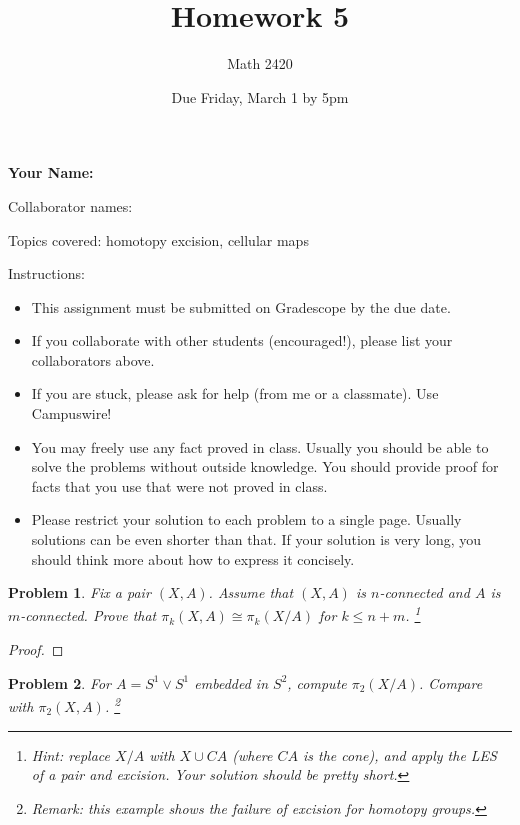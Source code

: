 \documentclass[11pt]{article}
\author{Math 2420}
\date{Due Friday, March 1 by 5pm}
\title{Homework 5}
\newtheorem{problem}{Problem}
\begin{document}
\maketitle

{\bf\Large Your Name:} 

Collaborator names: 


\vspace{.3in}
Topics covered: homotopy excision, cellular maps

Instructions: 
\begin{itemize}
\item This assignment must be submitted on Gradescope by the due date. 
\item If you collaborate with other students (encouraged!), please list your collaborators above. 
\item If you are stuck, please ask for help (from me or a classmate). Use Campuswire!  
\item You may freely use any fact proved in class. Usually you should be able to solve the problems without outside knowledge. You should provide proof for facts that you use that were not proved in class. 
\item Please restrict your solution to each problem to a single page. Usually solutions can be even shorter than that. If your solution is very long, you should think more about how to express it concisely.
\end{itemize}
\pagebreak 


\pagebreak 


\begin{problem}
Fix a pair $(X,A)$. Assume that $(X,A)$ is $n$-connected and $A$ is $m$-connected. Prove that $\pi_k(X,A)\cong\pi_k(X/A)$ for $k\le n+m$. \footnote{Hint: replace $X/A$ with $X\cup CA$ (where $CA$ is the cone), and apply the LES of a pair and excision. Your solution should be pretty short.}
\end{problem}

\begin{proof}

\end{proof}


\pagebreak 

\begin{problem}
For $A=S^1\vee S^1$ embedded in $S^2$, compute $\pi_2(X/A)$. Compare with $\pi_2(X,A)$. \footnote{Remark: this example shows the failure of excision for homotopy groups.} 
\end{problem}
\end{document}

